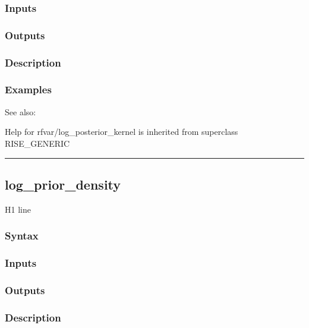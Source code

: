 \documentclass[letterpaper,10pt,english]{sphinxmanual}
\begin{document}
\subsubsection{Inputs}
\label{classes/models/@rfvar/rfvar:id64}

\subsubsection{Outputs}
\label{classes/models/@rfvar/rfvar:id65}

\subsubsection{Description}
\label{classes/models/@rfvar/rfvar:id66}

\subsubsection{Examples}
\label{classes/models/@rfvar/rfvar:id67}
See also:

Help for rfvar/log\_posterior\_kernel is inherited from superclass RISE\_GENERIC


\bigskip\hrule{}\bigskip



\subsection{log\_prior\_density}
\label{classes/models/@rfvar/rfvar:id68}\label{classes/models/@rfvar/rfvar:log-prior-density}
H1 line


\subsubsection{Syntax}
\label{classes/models/@rfvar/rfvar:id69}

\subsubsection{Inputs}
\label{classes/models/@rfvar/rfvar:id70}

\subsubsection{Outputs}
\label{classes/models/@rfvar/rfvar:id71}

\subsubsection{Description}
\label{classes/models/@rfvar/rfvar:id72}
\end{document}
